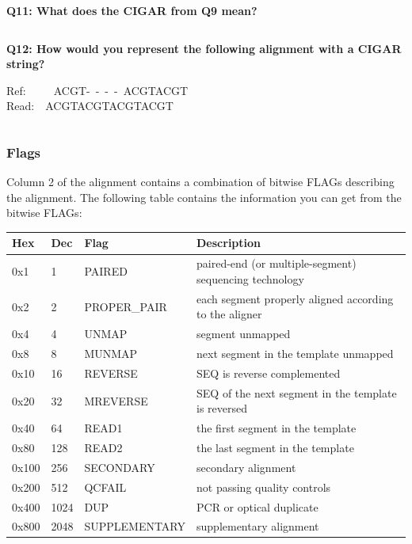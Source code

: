 \documentclass[11pt]{article}
\makeatletter
\newcommand{\boxspacing}{\kern\kvtcb@left@rule\kern\kvtcb@boxsep}
\newcommand{\prompt}[4]{
        {\ttfamily\llap{{\color{#2}[#3]:\hspace{3pt}#4}}\vspace{-\baselineskip}}
    }
\makeatother
\begin{document}
\textbf{Q11: What does the CIGAR from Q9 mean?}

    \begin{tcolorbox}[breakable, size=fbox, boxrule=1pt, pad at break*=1mm,colback=cellbackground, colframe=cellborder]
\prompt{In}{incolor}{ }{\boxspacing}
\begin{Verbatim}[commandchars=\\\{\}]

\end{Verbatim}
\end{tcolorbox}

    \textbf{Q12: How would you represent the following alignment with a
CIGAR string?}

Ref:~~~~~ACGT-~-~-~-~ACGTACGT\\
Read:~~ACGTACGTACGTACGT

    \begin{tcolorbox}[breakable, size=fbox, boxrule=1pt, pad at break*=1mm,colback=cellbackground, colframe=cellborder]
\prompt{In}{incolor}{ }{\boxspacing}
\begin{Verbatim}[commandchars=\\\{\}]

\end{Verbatim}
\end{tcolorbox}

    \hypertarget{flags}{%
\subsubsection{Flags}\label{flags}}

Column 2 of the alignment contains a combination of bitwise FLAGs
describing the alignment. The following table contains the information
you can get from the bitwise FLAGs:

\begin{longtable}[]{@{}llll@{}}
\toprule
Hex & Dec & Flag & Description \\
\midrule
\endhead
0x1 & 1 & PAIRED & paired-end (or multiple-segment) sequencing
technology \\
0x2 & 2 & PROPER\_PAIR & each segment properly aligned according to the
aligner \\
0x4 & 4 & UNMAP & segment unmapped \\
0x8 & 8 & MUNMAP & next segment in the template unmapped \\
0x10 & 16 & REVERSE & SEQ is reverse complemented \\
0x20 & 32 & MREVERSE & SEQ of the next segment in the template is
reversed \\
0x40 & 64 & READ1 & the first segment in the template \\
0x80 & 128 & READ2 & the last segment in the template \\
0x100 & 256 & SECONDARY & secondary alignment \\
0x200 & 512 & QCFAIL & not passing quality controls \\
0x400 & 1024 & DUP & PCR or optical duplicate \\
0x800 & 2048 & SUPPLEMENTARY & supplementary alignment \\
\bottomrule
\end{longtable}
\end{document}
